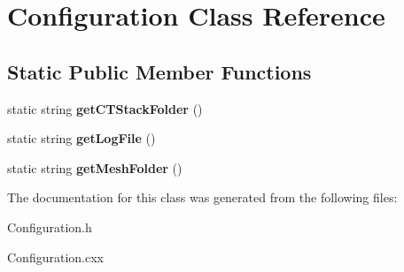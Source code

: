 \hypertarget{class_configuration}{
\section{Configuration Class Reference}
\label{class_configuration}
}
\subsection*{Static Public Member Functions}
\begin{DoxyCompactItemize}
\item 
\hypertarget{class_configuration_ad949a78dbbddf197a571ac4796d304d9}{
static string {\bfseries getCTStackFolder} ()}
\label{class_configuration_ad949a78dbbddf197a571ac4796d304d9}

\item 
\hypertarget{class_configuration_ac9eb5586a08336c4f077de0419c1c88c}{
static string {\bfseries getLogFile} ()}
\label{class_configuration_ac9eb5586a08336c4f077de0419c1c88c}

\item 
\hypertarget{class_configuration_a1899d8ff5ea68cd3c8ca7b6fffce254a}{
static string {\bfseries getMeshFolder} ()}
\label{class_configuration_a1899d8ff5ea68cd3c8ca7b6fffce254a}

\end{DoxyCompactItemize}


The documentation for this class was generated from the following files:\begin{DoxyCompactItemize}
\item 
Configuration.h\item 
Configuration.cxx\end{DoxyCompactItemize}
